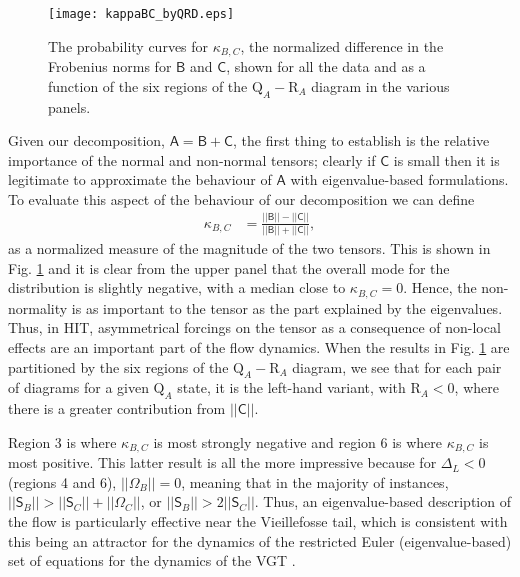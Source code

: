 \documentclass[preprint,amssymb,amsmath,aip,cha]{revtex4-1}
\begin{document}
\begin{figure}
\vspace*{2mm}
\begin{center}
\texttt{[image: kappaBC\_byQRD.eps]}
\end{center}
\caption{The probability curves for $\kappa_{B,C}$, the normalized difference in the Frobenius norms for $\mathsf{B}$ and $\mathsf{C}$, shown for all the data and as a function of the six regions of the $\mbox{Q}_{A}-\mbox{R}_{A}$ diagram  in the various panels.} 
\label{fig.kappaBC}
\end{figure}

Given our decomposition, $\mathsf{A} = \mathsf{B} + \mathsf{C}$, the first thing to establish is the relative importance of the normal and non-normal tensors; clearly if $\mathsf{C}$ is small then it is legitimate to approximate the behaviour of $\mathsf{A}$ with eigenvalue-based formulations. To evaluate this aspect of the behaviour of our decomposition we can define
\begin{align}
\label{eq.kappaBC}
\kappa_{B,C} &= \frac{||\mathsf{B}|| - ||\mathsf{C}||}{||\mathsf{B}|| + ||\mathsf{C}||},
\end{align} 
as a normalized measure of the magnitude of the two tensors. This is shown in Fig. \ref{fig.kappaBC} and it is clear from the upper panel that the overall mode for the distribution is slightly negative, with a median close to $\kappa_{B,C} = 0$. Hence, the  non-normality is as important to the tensor as the part explained by the eigenvalues. Thus, in HIT, asymmetrical forcings on the tensor as a consequence of non-local effects are an important part of the flow dynamics.  When the results in Fig. \ref{fig.kappaBC} are partitioned by the six regions of the $\mbox{Q}_{A}-\mbox{R}_{A}$ diagram, we see that for each pair of diagrams for a given $\mbox{Q}_{A}$ state, it is the left-hand variant, with $\mbox{R}_{A} < 0$, where there is a greater contribution from $||\mathsf{C}||$. 

Region 3 is where $\kappa_{B,C}$ is most strongly negative and region 6 is where $\kappa_{B,C}$ is most positive. This latter result is all the more impressive because for $\Delta_{L} < 0$ (regions 4 and 6), $||\mathsf{\Omega}_{B}|| = 0$, meaning that in the majority of instances, $||\mathsf{S}_{B}|| >||\mathsf{S}_{C}|| + ||\mathsf{\Omega}_{C}||$, or $||\mathsf{S}_{B}|| >2||\mathsf{S}_{C}||$. Thus, an eigenvalue-based description of the flow is particularly effective near the Vieillefosse tail, which is consistent with this being an attractor for the dynamics of the restricted Euler (eigenvalue-based) set of equations for the dynamics of the VGT \citep{cantwell92}.
\end{document}

